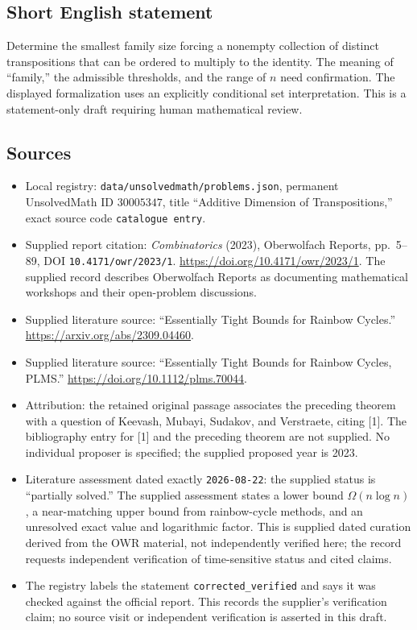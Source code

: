 \documentclass[11pt]{article}
\begin{document}
\subsection{Short English statement}
Determine the smallest family size forcing a nonempty collection of distinct transpositions that can be ordered to multiply to the identity. The meaning of ``family,'' the admissible thresholds, and the range of \(n\) need confirmation. The displayed formalization uses an explicitly conditional set interpretation. This is a statement-only draft requiring human mathematical review.
\subsection{Sources}
\begin{itemize}
\item Local registry: \texttt{data/unsolvedmath/problems.json}, permanent UnsolvedMath ID \(30005347\), title ``Additive Dimension of Transpositions,'' exact source code \texttt{catalogue entry}.
\item Supplied report citation: \emph{Combinatorics} (2023), Oberwolfach Reports, pp.\ 5--89, DOI \texttt{10.4171/owr/2023/1}. \url{https://doi.org/10.4171/owr/2023/1}. The supplied record describes Oberwolfach Reports as documenting mathematical workshops and their open-problem discussions.
\item Supplied literature source: ``Essentially Tight Bounds for Rainbow Cycles.'' \url{https://arxiv.org/abs/2309.04460}.
\item Supplied literature source: ``Essentially Tight Bounds for Rainbow Cycles, PLMS.'' \url{https://doi.org/10.1112/plms.70044}.
\item Attribution: the retained original passage associates the preceding theorem with a question of Keevash, Mubayi, Sudakov, and Verstraete, citing [1]. The bibliography entry for [1] and the preceding theorem are not supplied. No individual proposer is specified; the supplied proposed year is 2023.
\item Literature assessment dated exactly \texttt{2026-08-22}: the supplied status is ``partially solved.'' The supplied assessment states a lower bound \(\Omega(n\log n)\), a near-matching upper bound from rainbow-cycle methods, and an unresolved exact value and logarithmic factor. This is supplied dated curation derived from the OWR material, not independently verified here; the record requests independent verification of time-sensitive status and cited claims.
\item The registry labels the statement \texttt{corrected\_verified} and says it was checked against the official report. This records the supplier's verification claim; no source visit or independent verification is asserted in this draft.
\end{itemize}
\end{document}
